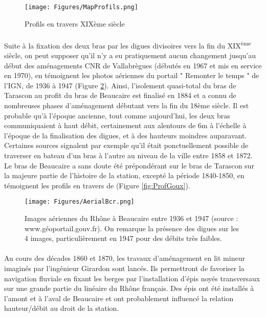 \documentclass[11pt]{article}
\begin{document}
        \begin{figure}[h]
            \centering
            \texttt{[image: Figures/MapProfils.png]}
            \caption{Profils en travers XIXème siècle}
            \label{fig:Profis19eme}
        \end{figure}
            
\FloatBarrier
        \paragraph{} Suite à la fixation des deux bras par les digues divisoires vers la fin du XIX\textsuperscript{ème} siècle, on peut supposer qu'il n'y a eu pratiquement aucun changement jusqu'au début des aménagements CNR de Vallabrègues (débutés en 1967 et mis en service en 1970), en témoignent les photos aériennes du portail " Remonter le temps " de l'IGN, de 1936 à 1947 (Figure \ref{fig:AerialBcr}). Ainsi, l'isolement quasi-total du bras de Tarascon au profit du bras de Beaucaire est finalisé en 1884 et a connu de nombreuses phases d'aménagement débutant vers la fin du 18ème siècle. Il est probable qu'à l'époque ancienne, tout comme aujourd'hui, les deux bras communiquaient à haut débit, certainement aux alentours de 6m à l'échelle à l'époque de la finalisation des digues, et à des hauteurs moindres auparavant. Certaines sources signalent par exemple qu'il était ponctuellement possible de traverser en bateau d'un bras à l'autre au niveau de la ville entre 1858 et 1872. Le bras de Beaucaire a sans doute été prépondérant sur le bras de Tarascon sur la majeure partie de l'histoire de la station, excepté la période 1840-1850, en témoignent les profils en travers de \citet{goux_modification_1851} (Figure \ref{fig:ProfGoux}).
    
        \begin{figure}[h]
            \centering
        	\texttt{[image: Figures/AerialBcr.png]}
            \caption{Images aériennes du Rhône à Beaucaire entre 1936 et 1947 (source : www.géoportail.gouv.fr). On remarque la présence des digues sur les 4 images, particulièrement en 1947 pour des débits très faibles.}
            \label{fig:AerialBcr}
        \end{figure}
    
		\paragraph{} Au cours des décades 1860 et 1870, les travaux d'aménagement en lit mineur imaginés par l'ingénieur Girardon sont lancés. Ils permettront de favoriser la navigation fluviale en fixant les berges par l'installation d'épis noyés transversaux sur une grande partie du linéaire du Rhône français. Des épis ont été installés à l'amont et à l'aval de Beaucaire et ont probablement influencé la relation hauteur/débit au droit de la station.
    
\end{document}
